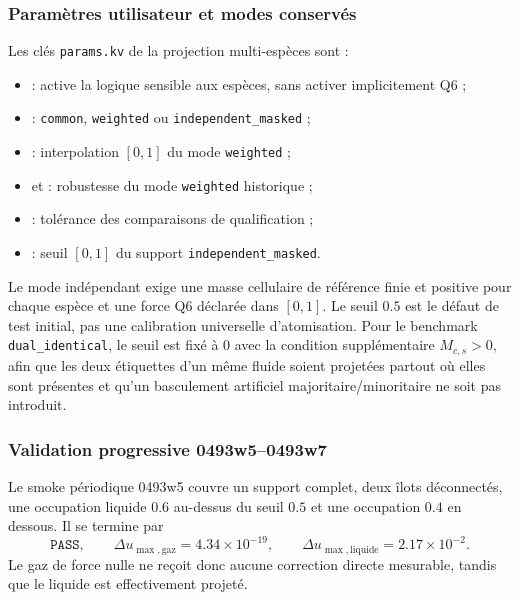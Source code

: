 \documentclass[11pt,a4paper]{article}
\begin{document}
\subsubsection{Paramètres utilisateur et modes conservés}

Les clés \texttt{params.kv} de la projection multi-espèces sont :
\begin{itemize}[nosep]
  \item {} : active la logique sensible aux espèces, sans activer implicitement Q6 ;
  \item {} : \texttt{common}, \texttt{weighted} ou \texttt{independent\_masked} ;
  \item {} : interpolation $[0,1]$ du mode \texttt{weighted} ;
  \item {} et  : robustesse du mode \texttt{weighted} historique ;
  \item {} : tolérance des comparaisons de qualification ;
  \item {} : seuil $[0,1]$ du support \texttt{independent\_masked}.
\end{itemize}

Le mode indépendant exige une masse cellulaire de référence finie et positive pour chaque espèce et une force Q6 déclarée dans $[0,1]$. Le seuil $0.5$ est le défaut de test initial, pas une calibration universelle d'atomisation. Pour le benchmark \texttt{dual\_identical}, le seuil est fixé à $0$ avec la condition supplémentaire $M_{c,s}>0$, afin que les deux étiquettes d'un même fluide soient projetées partout où elles sont présentes et qu'un basculement artificiel majoritaire/minoritaire ne soit pas introduit.

\subsubsection{Validation progressive 0493w5--0493w7}

Le smoke périodique 0493w5 couvre un support complet, deux îlots déconnectés, une occupation liquide $0.6$ au-dessus du seuil $0.5$ et une occupation $0.4$ en dessous. Il se termine par
\begin{equation}
  \texttt{PASS},\qquad
  \Delta u_{\max,\mathrm{gaz}}=4.34\times10^{-19},
  \qquad
  \Delta u_{\max,\mathrm{liquide}}=2.17\times10^{-2}.
\end{equation}
Le gaz de force nulle ne reçoit donc aucune correction directe mesurable, tandis que le liquide est effectivement projeté.
\end{document}

